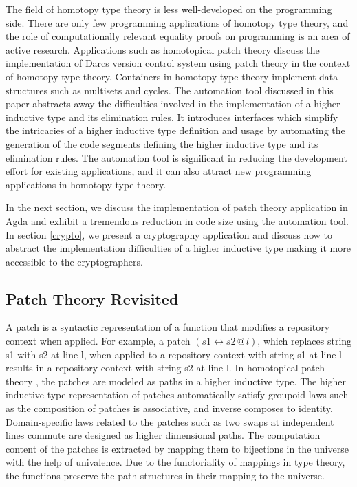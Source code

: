 \documentclass[sigplan,10pt]{acmart}
\begin{document}
The field of homotopy type theory is less well-developed on the programming side. There are only few programming applications of homotopy type theory, and the role of computationally relevant equality proofs on programming is an area of active research. Applications such as homotopical patch theory \cite{Angiuli-2014} discuss the implementation of Darcs \cite{Darcs-2005} version control system using patch theory \cite{Mimram-2013} \cite{Jason-2009} in the context of homotopy type theory. Containers in homotopy type theory \cite{Altenkirch-2014} \cite{Abbott-2005} implement data structures such as multisets and cycles. The automation tool discussed in this paper abstracts away the difficulties involved in the implementation of a higher inductive type and its elimination rules. It introduces interfaces which simplify the intricacies of a higher inductive type definition and usage by automating the generation of the code segments defining the higher inductive type and its elimination rules. The automation tool is significant in reducing the development effort for existing applications, and it can also attract new programming applications in homotopy type theory.

In the next section, we discuss the implementation of patch theory application in Agda and exhibit a tremendous reduction in code size using the automation tool. In section \ref{crypto}, we present a cryptography application and discuss how to abstract the implementation difficulties of a higher inductive type making it more accessible to the cryptographers.

\subsection{Patch Theory Revisited}
\label{patch-theory}
A patch is a syntactic representation of a function that modifies a repository context when applied. For example, a patch $(s1 \leftrightarrow s2 \, @ \, l)$, which replaces string s1 with s2 at line l, when applied to a repository context with string s1 at line l results in a repository context with string s2 at line l. In homotopical patch theory \cite{Angiuli-2014}, the patches are modeled as paths in a higher inductive type. The higher inductive type representation of patches automatically satisfy groupoid laws such as the composition of patches is associative, and inverse composes to identity. Domain-specific laws related to the patches such as two swaps at independent lines commute are designed as higher dimensional paths. The computation content of the patches is extracted by mapping them to bijections in the universe with the help of univalence. Due to the functoriality of mappings in type theory, the functions preserve the path structures in their mapping to the universe.
\end{document}
